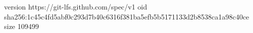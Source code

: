 version https://git-lfs.github.com/spec/v1
oid sha256:1c45c4fd5abf0c293d7b40c6316f381ba5efb5b5171133d2b8538ca1a98c40ce
size 109499
